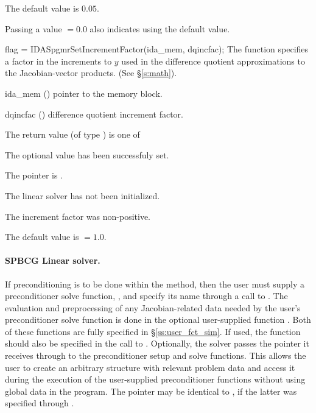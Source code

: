 {
  The default value is $0.05$.

  Passing a value $ = 0.0$ also indicates using the default value.
}
{
  flag = IDASpgmrSetIncrementFactor(ida\_mem, dqincfac);
}
{
  The function  specifies a factor in the 
  increments to $y$ used in the difference quotient approximations 
  to the Jacobian-vector products.  (See \S\ref{s:math}).
}
{
  \begin{args}[dqincfac]
  \item[ida\_mem] ()
    pointer to the {\ida} memory block.
  \item[dqincfac] ()
    difference quotient increment factor.
  \end{args}
}
{
  The return value  (of type ) is one of
  \begin{args}
  \item[\Id{IDASPGMR\_SUCCESS}] 
    The optional value has been successfuly set.
  \item[\Id{IDASPGMR\_MEM\_NULL}]
    The  pointer is .
  \item[\Id{IDASPGMR\_LMEM\_NULL}]
    The {\idaspgmr} linear solver has not been initialized.
  \item[\Id{IDASPGMR\_ILL\_INPUT}]
    The increment factor was non-positive.
  \end{args}
}
{
  The default value is  $=1.0$.
}
\noindent\paragraph{\bf SPBCG Linear solver.}
If preconditioning is to be done within the {\spbcg} method, then the user
must supply a preconditioner solve function, , and specify its
name through a call to .
The evaluation and preprocessing of any Jacobian-related data needed
by the user's preconditioner solve function is done in the optional
user-supplied function . Both of these functions are
fully specified in \S\ref{ss:user_fct_sim}.
If used, the  function should also be specified in the call to
.
Optionally, the {\idaspbcg} solver passes the pointer it receives through 
 to the preconditioner setup and solve functions.  
This allows the user to create an arbitrary structure with relevant problem data 
and access it during the execution of the user-supplied preconditioner functions
without using global data in the program.  
The pointer  may be identical to , if the latter was 
specified through .

